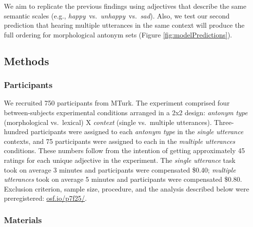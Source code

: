 \documentclass[floatsintext,doc]{apa6}
\begin{document}
We aim to replicate the previous findings using adjectives that describe the same semantic scales (e.g.,  \emph{happy}~vs.~\emph{unhappy}~vs.~\emph{sad}).
Also, we test our second prediction that hearing multiple utterances in the same context will produce the full ordering for morphological antonym sets (Figure \ref{fig:modelPredictions}).

\subsection{Methods}
\subsubsection{Participants}\label{participants-1}

We recruited 750 participants from MTurk.
The experiment comprised four between-subjects experimental conditions arranged in a 2x2 design: \emph{antonym type} (morphological vs.~lexical) X \emph{context} (single vs.~multiple utterances).
Three-hundred participants were assigned to each \emph{antonym type} in the \emph{single utterance} contexts, and 75 participants were assigned to each in the \emph{multiple utterances} conditions.
These numbers follow from the intention of getting approximately 45 ratings for each unique adjective in the experiment.
The \emph{single utterance} task took on average 3 minutes and participants were compensated \$0.40; \emph{multiple utterances} took on average 5 minutes and participants were compensated \$0.80.
Exclusion criterion, sample size, procedure, and the analysis described below were preregistered: \url{osf.io/p7f25/}.

\subsubsection{Materials}\label{materials-1}
\end{document}
